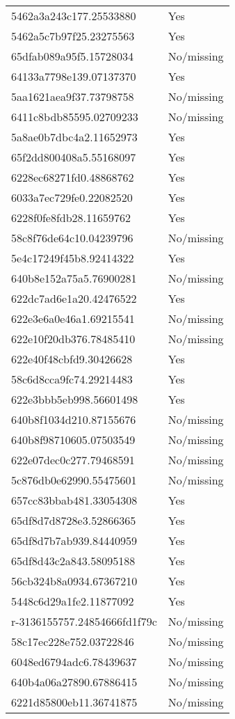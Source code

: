 \begin{tabular}{ll}
5462a3a243c177.25533880 & Yes \\
5462a5c7b97f25.23275563 & Yes \\
65dfab089a95f5.15728034 & No/missing \\
64133a7798e139.07137370 & Yes \\
5aa1621aea9f37.73798758 & No/missing \\
6411c8bdb85595.02709233 & No/missing \\
5a8ae0b7dbc4a2.11652973 & Yes \\
65f2dd800408a5.55168097 & Yes \\
6228ec68271fd0.48868762 & Yes \\
6033a7ec729fe0.22082520 & Yes \\
6228f0fe8fdb28.11659762 & Yes \\
58c8f76de64c10.04239796 & No/missing \\
5e4c17249f45b8.92414322 & Yes \\
640b8e152a75a5.76900281 & No/missing \\
622dc7ad6e1a20.42476522 & Yes \\
622e3e6a0e46a1.69215541 & No/missing \\
622e10f20db376.78485410 & No/missing \\
622e40f48cbfd9.30426628 & Yes \\
58c6d8cca9fc74.29214483 & Yes \\
622e3bbb5eb998.56601498 & Yes \\
640b8f1034d210.87155676 & No/missing \\
640b8f98710605.07503549 & No/missing \\
622e07dec0c277.79468591 & No/missing \\
5c876db0e62990.55475601 & No/missing \\
657cc83bbab481.33054308 & Yes \\
65df8d7d8728e3.52866365 & Yes \\
65df8d7b7ab939.84440959 & Yes \\
65df8d43c2a843.58095188 & Yes \\
56cb324b8a0934.67367210 & Yes \\
5448c6d29a1fe2.11877092 & Yes \\
r-3136155757.24854666fd1f79c & No/missing \\
58c17ec228e752.03722846 & No/missing \\
6048ed6794adc6.78439637 & No/missing \\
640b4a06a27890.67886415 & No/missing \\
6221d85800eb11.36741875 & No/missing \\

\end{tabular}
